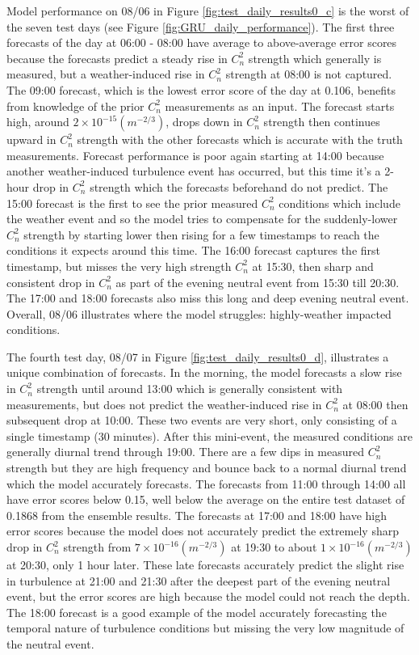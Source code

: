 Model performance on 08/06 in Figure \ref{fig:test_daily_results0_c} is the worst of the seven test days (see Figure \ref{fig:GRU_daily_performance}). The first three forecasts of the day at 06:00 - 08:00 have average to above-average error scores because the forecasts predict a steady rise in $C_{n}^{2}$ strength which generally is measured, but a weather-induced rise in $C_{n}^{2}$ strength at 08:00 is not captured. The 09:00 forecast, which is the lowest error score of the day at 0.106, benefits from knowledge of the prior $C_{n}^{2}$ measurements as an input. The forecast starts high, around $2 \times 10^{-15} (m^{-2/3})$, drops down in $C_{n}^{2}$ strength then continues upward in $C_{n}^{2}$ strength with the other forecasts which is accurate with the truth measurements. Forecast performance is poor again starting at 14:00 because another weather-induced turbulence event has occurred, but this time it's a 2-hour drop in $C_{n}^{2}$ strength which the forecasts beforehand do not predict. The 15:00 forecast is the first to see the prior measured $C_{n}^{2}$ conditions which include the weather event and so the model tries to compensate for the suddenly-lower $C_{n}^{2}$ strength by starting lower then rising for a few timestamps to reach the conditions it expects around this time. The 16:00 forecast captures the first timestamp, but misses the very high strength $C_{n}^{2}$ at 15:30, then sharp and consistent drop in $C_{n}^{2}$ as part of the evening neutral event from 15:30 till 20:30. The 17:00 and 18:00 forecasts also miss this long and deep evening neutral event. Overall, 08/06 illustrates where the model struggles: highly-weather impacted conditions.

The fourth test day, 08/07 in Figure \ref{fig:test_daily_results0_d}, illustrates a unique combination of forecasts. In the morning, the model forecasts a slow rise in $C_{n}^{2}$ strength until around 13:00 which is generally consistent with measurements, but does not predict the weather-induced rise in $C_{n}^{2}$ at 08:00 then subsequent drop at 10:00. These two events are very short, only consisting of a single timestamp (30 minutes). After this mini-event, the measured conditions are generally diurnal trend through 19:00. There are a few dips in measured $C_{n}^{2}$ strength but they are high frequency and bounce back to a normal diurnal trend which the model accurately forecasts. The forecasts from 11:00 through 14:00 all have error scores below 0.15, well below the average on the entire test dataset of 0.1868 from the ensemble results. The forecasts at 17:00 and 18:00 have high error scores because the model does not accurately predict the extremely sharp drop in $C_{n}^{2}$ strength from $7 \times 10^{-16} (m^{-2/3})$ at 19:30 to about $1 \times 10^{-16} (m^{-2/3})$ at 20:30, only 1 hour later. These late forecasts accurately predict the slight rise in turbulence at 21:00 and 21:30 after the deepest part of the evening neutral event, but the error scores are high because the model could not reach the depth. The 18:00 forecast is a good example of the model accurately forecasting the temporal nature of turbulence conditions but missing the very low magnitude of the neutral event.


